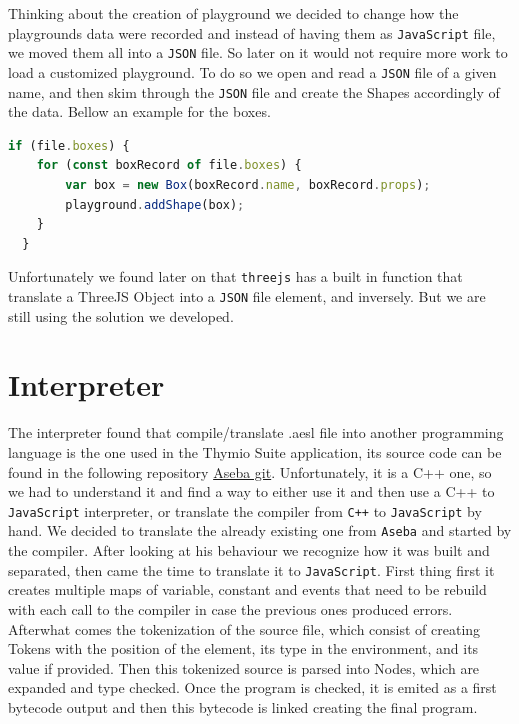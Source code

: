 \documentclass{scrbook}
\begin{document}
Thinking about the creation of playground we decided to change how the playgrounds data were recorded and instead of having them as \texttt{JavaScript} file, we moved them all into a \texttt{JSON} file. So later on it would not require more work to load a 
customized playground. To do so we open and read a \texttt{JSON} file of a given name, and then skim through the \texttt{JSON} file and create the Shapes accordingly of the data. Bellow an example for the boxes.
\begin{lstlisting}[language=JavaScript, basicstyle=\ttfamily\small]
  if (file.boxes) {
    for (const boxRecord of file.boxes) {
        var box = new Box(boxRecord.name, boxRecord.props);
        playground.addShape(box);
    }
  }
\end{lstlisting} 

Unfortunately we found later on that \texttt{threejs} has a built in function that translate a ThreeJS Object into a \texttt{JSON} file element, and inversely. But we are still using the solution we developed.

\section{Interpreter}

The interpreter found that compile/translate .aesl file into another programming language is the one used in the Thymio Suite application, its source code can be found in the following repository \href{https://github.com/aseba-community/aseba/tree/master/aseba/compiler}{Aseba git}.
Unfortunately, it is a C++ one, so we had to understand it and find a way to either use it and then use a C++ to \texttt{JavaScript} interpreter, or translate the compiler from \texttt{C++} to \texttt{JavaScript} by hand.
We decided to translate the already existing one from \texttt{Aseba} and started by the compiler. After looking at his behaviour we recognize how it was built and separated,
then came the time to translate it to \texttt{JavaScript}. First thing first it creates multiple maps of variable, constant and events that need to be rebuild with each call to the compiler in case the previous ones produced errors.
Afterwhat comes the tokenization of the source file, which consist of creating Tokens with the position of the element, its type in the environment, and its value if provided. Then this tokenized source is parsed into Nodes, 
which are expanded and type checked. Once the program is checked, it is emited as a first bytecode output and then this bytecode is linked creating the final program.
\end{document}
